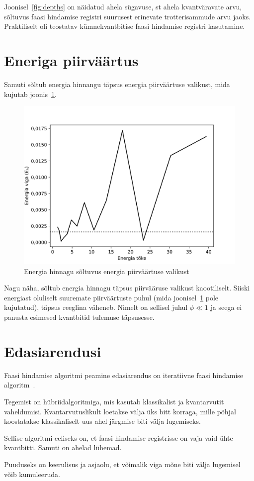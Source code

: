 \documentclass[12pt]{report}
\begin{document}
Joonisel~\ref{fig:depths} on näidatud ahela sügavuse, st ahela kvantväravate arvu, sõltuvus faasi hindamise registri suurusest erinevate trotterisammude arvu jaoks.
Praktiliselt oli teostatav kümnekvantbitise faasi hindamise registri kasutamine.

\section{Eneriga piirväärtus}

Samuti sõltub energia hinnangu täpsus energia piirväärtuse valikust, mida kujutab joonis~\ref{fig:bounds}.

\begin{figure}[h]
    \centering
    \includegraphics{bounds.jpg}
    \caption{Energia hinnagu sõltuvus energia piirväärtuse valikust}
    \label{fig:bounds}
\end{figure}

Nagu näha, sõltub energia hinnagu täpsus piirvääruse valikust kaootiliselt.
Siiski energiast oluliselt suuremate piirväärtuste puhul (mida joonisel~\ref{fig:bounds} pole kujutatud), täpsus reeglina väheneb.
Nimelt on sellisel juhul \(\phi \ll 1\) ja seega ei panusta esimesed kvantbitid tulemuse täpsusesse.

\section{Edasiarendusi}

Faasi hindamise algoritmi peamine edasiarendus on iteratiivne faasi hindamise algoritm~\cite{mcardle+etal, omalley+etal}.

Tegemist on hübriidalgoritmiga, mis kasutab klassikalist ja kvantarvutit vaheldumisi.
Kvantarvutuslikult loetakse välja üks bitt korraga, mille põhjal koostatakse klassikaliselt uus ahel järgmise biti välja lugemiseks.

Sellise algoritmi eeliseks on, et faasi hindamise registrisse on vaja vaid ühte kvantbitti.
Samuti on ahelad lühemad.

Puuduseks on keerulisus ja asjaolu, et võimalik viga mõne biti välja lugemisel võib kumuleeruda.

\printbibliography[heading=bibintoc, title=Kirjandus]
\end{document}
